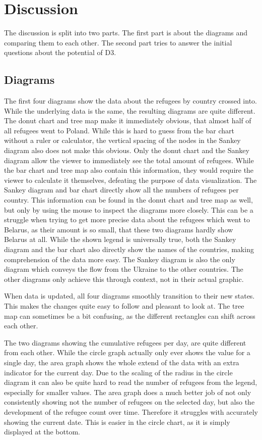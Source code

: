\chapter{Discussion}
The discussion is split into two parts. The first part is about the diagrams and comparing them to each other. The second part tries to answer the initial questions about the potential of D3.

\section{Diagrams}
The first four diagrams show the data about the refugees by country crossed into. While the underlying data is the same, the resulting diagrams are quite different. 
The donut chart and tree map make it immediately obvious, that almost half of all refugees went to Poland. While this is hard to guess from the bar chart without a ruler or calculator, the vertical spacing of the nodes in the Sankey diagram also does not make this obvious.
Only the donut chart and the Sankey diagram allow the viewer to immediately see the total amount of refugees. While the bar chart and tree map also contain this information, they would require the viewer to calculate it themselves, defeating the purpose of data visualization.
The Sankey diagram and bar chart directly show all the numbers of refugees per country. This information can be found in the donut chart and tree map as well, but only by using the mouse to inspect the diagrams more closely. This can be a struggle when trying to get more precise data about the refugees which went to Belarus, as their amount is so small, that these two diagrams hardly show Belarus at all.
While the shown legend is universally true, both the Sankey diagram and the bar chart also directly show the names of the countries, making comprehension of the data more easy.
The Sankey diagram is also the only diagram which conveys the flow from the Ukraine to the other countries. The other diagrams only achieve this through context, not in their actual graphic.

When data is updated, all four diagrams smoothly transition to their new states. This makes the changes quite easy to follow and pleasant to look at. The tree map can sometimes be a bit confusing, as the different rectangles can shift across each other.

The two diagrams showing the cumulative refugees per day, are quite different from each other. While the circle graph actually only ever shows the value for a single day, the area graph shows the whole extend of the data with an extra indicator for the current day.
Due to the scaling of the radius in the circle diagram it can also be quite hard to read the number of refugees from the legend, especially for smaller values.
The area graph does a much better job of not only consistently showing not the number of refugees on the selected day, but also the development of the refugee count over time. Therefore it struggles with accurately showing the current date. This is easier in the circle chart, as it is simply displayed at the bottom.

